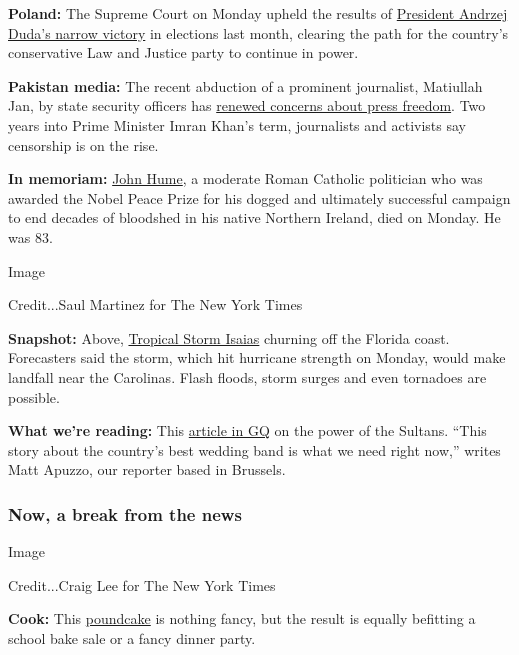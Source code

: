 \textbf{Poland:} The Supreme Court on Monday upheld the results of
\href{https://www.nytimes.com/2020/08/03/world/europe/poland-court-presidential-election.html}{President
Andrzej Duda's narrow victory} in elections last month, clearing the
path for the country's conservative Law and Justice party to continue in
power.

\textbf{Pakistan media:} The recent abduction of a prominent journalist,
Matiullah Jan, by state security officers has
\href{https://www.nytimes.com/2020/08/03/world/asia/pakistan-media-abductions.html}{renewed
concerns about press freedom}. Two years into Prime Minister Imran
Khan's term, journalists and activists say censorship is on the rise.

\textbf{In memoriam:}
\href{https://www.nytimes.com/2020/08/03/obituaries/john-hume-dies.html}{John
Hume}, a moderate Roman Catholic politician who was awarded the Nobel
Peace Prize for his dogged and ultimately successful campaign to end
decades of bloodshed in his native Northern Ireland, died on Monday. He
was 83.

Image

Credit...Saul Martinez for The New York Times

\textbf{Snapshot:} Above,
\href{https://www.nytimes.com/2020/08/03/us/isaias-storm-updates.html\#link-17297d4d}{Tropical
Storm Isaias} churning off the Florida coast. Forecasters said the
storm, which hit hurricane strength on Monday, would make landfall near
the Carolinas. Flash floods, storm surges and even tornadoes are
possible.

\textbf{What we're reading:} This
\href{https://www.gq.com/story/americas-best-wedding-band-the-sultans}{article
in GQ} on the power of the Sultans. ``This story about the country's
best wedding band is what we need right now,'' writes Matt Apuzzo, our
reporter based in Brussels.

\hypertarget{now-a-break-from-the-news}{%
\subsubsection{Now, a break from the
news}\label{now-a-break-from-the-news}}

Image

Credit...Craig Lee for The New York Times

\textbf{Cook:} This
\href{https://cooking.nytimes.com/recipes/12194-field-day-poundcake}{poundcake}
is nothing fancy, but the result is equally befitting a school bake sale
or a fancy dinner party.

